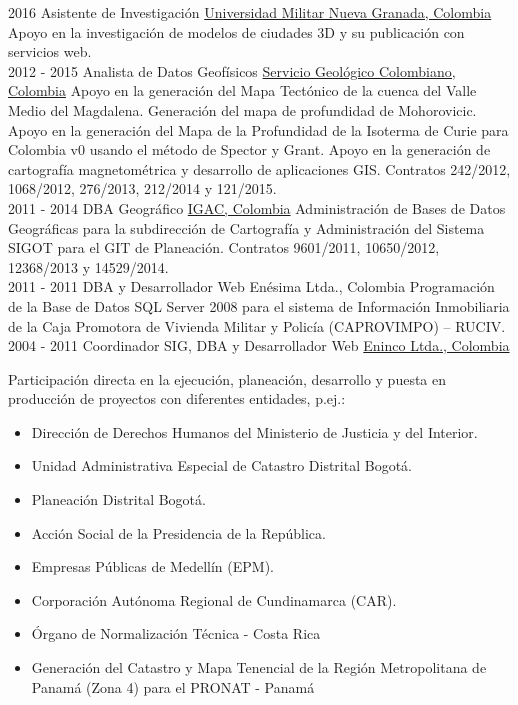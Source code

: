 \documentclass[]{friggeri-cv}
\begin{document}
\begin{entrylist}
    \entry
        {2016}
        {Asistente de Investigación}
        {\href{http://www.umng.edu.co/}{Universidad Militar Nueva Granada, Colombia}}
        {Apoyo en la investigación de modelos de ciudades 3D y su publicación con servicios web.\\}
    \entry
        {2012 - 2015}
        {Analista de Datos Geofísicos}
        {\href{http://www2.sgc.gov.co/}{Servicio Geológico Colombiano, Colombia}}
        {Apoyo en la generación del Mapa Tectónico de la cuenca del Valle Medio del Magdalena. Generación del mapa de profundidad de Mohorovicic. Apoyo en la generación del Mapa de la Profundidad de la Isoterma de Curie para Colombia v0 usando el método de Spector y Grant. Apoyo en la generación de cartografía magnetométrica y desarrollo de aplicaciones GIS. Contratos 242/2012, 1068/2012, 276/2013, 212/2014 y 121/2015.\\}
    \entry
        {2011 - 2014}
        {DBA Geográfico}
        {\href{http://www.igac.gov.co/igac}{IGAC, Colombia}}
        {Administración de Bases de Datos Geográficas para la subdirección de Cartografía y Administración del Sistema SIGOT para el GIT de Planeación. Contratos 9601/2011, 10650/2012, 12368/2013 y 14529/2014.\\}
    \entry
        {2011 - 2011}
        {DBA y Desarrollador Web}
        {Enésima Ltda., Colombia}
        {Programación de la Base de Datos SQL Server 2008 para el sistema de Información Inmobiliaria de la Caja Promotora de Vivienda Militar y Policía (CAPROVIMPO) – RUCIV.\\}
    \entry
        {2004 - 2011}
        {Coordinador SIG, DBA y Desarrollador Web}
        {\href{http://www.eninco.com.co/es/index.php?lang=en}{Eninco Ltda., Colombia}}
        {Participación directa en la ejecución, planeación, desarrollo y puesta en producción de proyectos con diferentes entidades, p.ej.:
        \begin{itemize}
            \item Dirección de Derechos Humanos del Ministerio de Justicia y del Interior.
            \item Unidad Administrativa Especial de Catastro Distrital Bogotá.
            \item Planeación Distrital Bogotá.
            \item Acción Social de la Presidencia de la República.
            \item Empresas Públicas de Medellín (EPM).
            \item Corporación Autónoma Regional de Cundinamarca (CAR).
            \item Órgano de Normalización Técnica - Costa Rica
            \item Generación del Catastro y Mapa Tenencial de la Región Metropolitana de Panamá (Zona 4) para el PRONAT - Panamá
        \end{itemize}
        }
\end{entrylist}     
\end{document}
